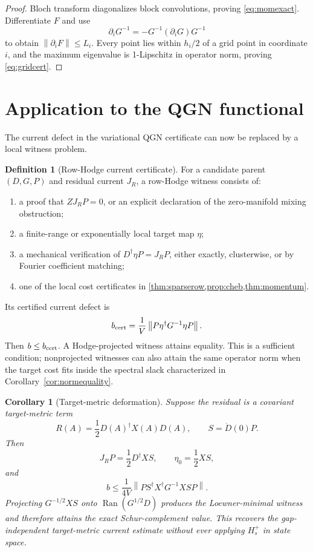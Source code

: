 \documentclass[11pt]{article}
\newtheorem{corollary}[theorem]{Corollary}
\theoremstyle{definition}
\newtheorem{definition}[theorem]{Definition}
\theoremstyle{remark}
\newcommand{\Ran}{\operatorname{Ran}}
\newcommand{\norm}[1]{\left\lVert #1\right\rVert}
\begin{document}
\begin{proof}
Bloch transform diagonalizes block convolutions, proving \eqref{eq:momexact}.  Differentiate $F$ and use
\[
 \partial_iG^{-1}=-G^{-1}(\partial_iG)G^{-1}
\]
to obtain $\norm{\partial_iF}\le L_i$.  Every point lies within $h_i/2$ of a grid point in coordinate $i$, and the maximum eigenvalue is 1-Lipschitz in operator norm, proving \eqref{eq:gridcert}.
\end{proof}

\section{Application to the QGN functional}

The current defect in the variational QGN certificate can now be replaced by a local witness problem.

\begin{definition}[Row-Hodge current certificate]
For a candidate parent $(D,G,P)$ and residual current $J_R$, a row-Hodge witness consists of:
\begin{enumerate}
\item a proof that $ZJ_RP=0$, or an explicit declaration of the zero-manifold mixing obstruction;
\item a finite-range or exponentially local target map $\eta$;
\item a mechanical verification of $D^\dagger\eta P=J_RP$, either exactly, clusterwise, or by Fourier coefficient matching;
\item one of the local cost certificates in \cref{thm:sparserow,prop:cheb,thm:momentum}.
\end{enumerate}
Its certified current defect is
\begin{equation}
 b_{\rm cert}=\frac1V\norm{P\eta^\dagger G^{-1}\eta P}.
 \label{eq:bcert}
\end{equation}
Then $b\le b_{\rm cert}$.  A Hodge-projected witness attains equality.  This is a sufficient condition; nonprojected witnesses can also attain the same operator norm when the target cost fits inside the spectral slack characterized in Corollary~\ref{cor:normequality}.
\end{definition}

\begin{corollary}[Target-metric deformation]
Suppose the residual is a covariant target-metric term
\begin{equation}
 R(A)=\frac12D(A)^\dagger X(A)D(A),
 \qquad S=\dot D(0)P.
 \label{eq:targetmetricapp}
\end{equation}
Then
\begin{equation}
 J_RP=\frac12D^\dagger XS,
 \qquad
 \eta_0=\frac12XS,
 \label{eq:etaXS}
\end{equation}
and
\begin{equation}
 \boxed{
 b\le\frac1{4V}\norm{PS^\dagger X^\dagger G^{-1}XSP}.}
 \label{eq:XScost}
\end{equation}
Projecting $G^{-1/2}XS$ onto $\Ran(G^{1/2}D)$ produces the Loewner-minimal witness and therefore attains the exact Schur-complement value.  This recovers the gap-independent target-metric current estimate without ever applying $H_s^+$ in state space.
\end{corollary}
\end{document}
